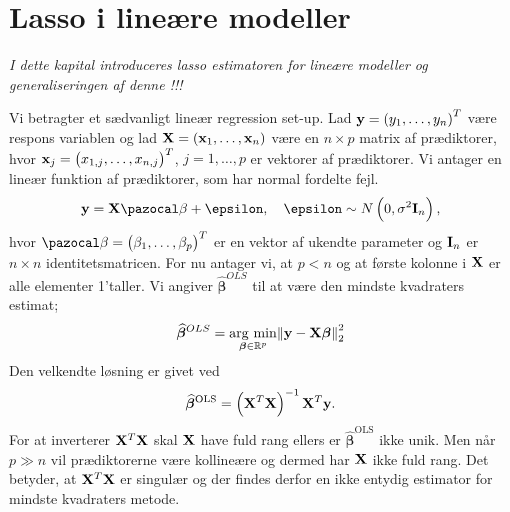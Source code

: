 \chapter{Lasso i lineære modeller}
\textit{I dette kapital introduceres lasso estimatoren for lineære modeller og generaliseringen af denne !!!}

Vi betragter et sædvanligt lineær regression set-up. Lad $\textbf{y} = \del{y_1, \dots, y_n}^T$ være respons variablen og lad $\textbf{X} = \del{\textbf{x}_1, \dots, \textbf{x}_n}$ være en $n \times p$ matrix af prædiktorer, hvor $\textbf{x}_j = \del{x_{1,j}, \dots, x_{n,j}}^T$, $j = 1, \dots, p$ er vektorer af prædiktorer. 
Vi antager en lineær funktion af prædiktorer, som har normal fordelte fejl. 
\begin{align*}
\textbf{y} = \textbf{X} \mathcal{\beta} + \epsilon, \quad \epsilon \sim N \del{0, \sigma^2 \text{\textbf{I}}_n},
\end{align*}
hvor $\mathcal{\beta} = \del{\beta_1, \dots, \beta_p}^T$ er en vektor af ukendte parameter og $\text{\textbf{I}}_n$ er $n \times n$ identitetsmatricen. 
For nu antager vi, at $p<n$ og at første kolonne i $\mathbf{X}$ er alle elementer 1'taller. 
Vi angiver $\widehat{\boldsymbol{\beta}}^{OLS}$ til at være den mindste kvadraters estimat;
\begin{align*}
\widehat{\boldsymbol{\beta}}^{OLS} = \underset{\boldsymbol\beta \in \mathbb{R}^p}{\operatorname*{\arg\,\min}} \norm{ \textbf{y} - \textbf{X}\boldsymbol\beta}^2_2
\end{align*}
Den velkendte løsning er givet ved 
\begin{align*}
\widehat{\boldsymbol\beta}^{\text{OLS}} = \del{\X^T \X}^{-1} \X^T \y.
\end{align*}
For at inverterer $\mathbf{X}^T \mathbf{X}$ skal $\mathbf{X}$ have fuld rang ellers er $\widehat{\boldsymbol\beta}^{\text{OLS}}$ ikke unik. 
Men når  \(p \gg n\) vil prædiktorerne være kollineære og dermed har \(\mathbf{X}\) ikke fuld rang.
Det betyder, at $\mathbf{X}^T \mathbf{X}$ er singulær og der findes derfor en ikke entydig estimator for mindste kvadraters metode.
